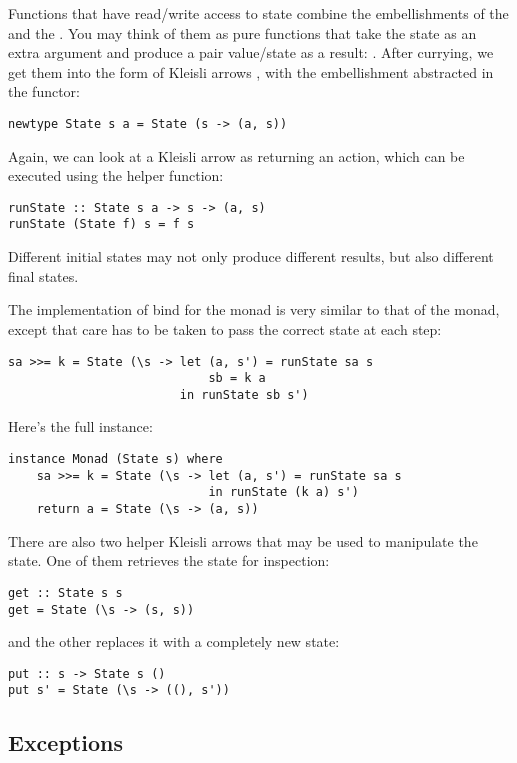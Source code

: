 Functions that have read/write access to state combine the
embellishments of the  and the . You may
think of them as pure functions that take the state as an extra argument
and produce a pair value/state as a result:
. After currying, we get them
into the form of Kleisli arrows
, with the
embellishment abstracted in the  functor:

\begin{verbatim}
newtype State s a = State (s -> (a, s))
\end{verbatim}
Again, we can look at a Kleisli arrow as returning an action, which can
be executed using the helper function:

\begin{verbatim}
runState :: State s a -> s -> (a, s)
runState (State f) s = f s
\end{verbatim}
Different initial states may not only produce different results, but
also different final states.

The implementation of bind for the  monad is very similar
to that of the  monad, except that care has to be taken
to pass the correct state at each step:

\begin{verbatim}
sa >>= k = State (\s -> let (a, s') = runState sa s
                            sb = k a 
                        in runState sb s')
\end{verbatim}
Here's the full instance:

\begin{verbatim}
instance Monad (State s) where
    sa >>= k = State (\s -> let (a, s') = runState sa s
                            in runState (k a) s')
    return a = State (\s -> (a, s))
\end{verbatim}
There are also two helper Kleisli arrows that may be used to manipulate
the state. One of them retrieves the state for inspection:

\begin{verbatim}
get :: State s s
get = State (\s -> (s, s))
\end{verbatim}
and the other replaces it with a completely new state:

\begin{verbatim}
put :: s -> State s ()
put s' = State (\s -> ((), s'))
\end{verbatim}

\subsection{Exceptions}\label{exceptions}

